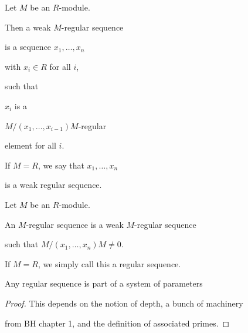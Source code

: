 \begin{definition}

  \label{def:weak_reg_seq}


  Let $M$ be an $R$-module.

  Then a weak $M$-regular sequence

  is a sequence $x_1, \ldots, x_n$ 

  with $x_i \in R$ for all $i$,

  such that 

  $x_i$ is a

  $M / (x_1, \ldots, x_{i-1}) M$-regular

  element for all $i$.

  If $M = R$, we say that $x_1, \ldots, x_n$

  is a weak regular sequence. 

\end{definition}



\begin{definition}

  \label{def:reg_seq}


  Let $M$ be an $R$-module.

  An $M$-regular sequence is a weak $M$-regular sequence

  such that $M / (x_1, \ldots, x_n) M \neq 0$.

  If $M = R$, we simply call this a regular sequence.

\end{definition}



\begin{theorem}

  \label{thm:reg_seq_part_of_sys_param}


  Any regular sequence is part of a system of parameters

\end{theorem}



\begin{proof}

  This depends on the notion of depth, a bunch of machinery

  from BH chapter 1, and the definition of associated primes.

\end{proof}



